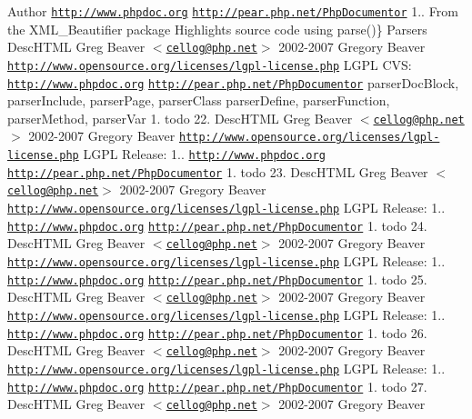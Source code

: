 \begin{DoxyAuthor}{\-Author}
\href{http://www.phpdoc.org}{\tt http\-://www.\-phpdoc.\-org}  \href{http://pear.php.net/PhpDocumentor}{\tt http\-://pear.\-php.\-net/\-Php\-Documentor}  1..  \-From the \-X\-M\-L\-\_\-\-Beautifier package \-Highlights source code using  parse()\}   \-Parsers   \-Desc\-H\-T\-M\-L  \-Greg \-Beaver $<$\href{mailto:cellog@php.net}{\tt cellog@php.\-net}$>$  2002-\/2007 \-Gregory \-Beaver  \href{http://www.opensource.org/licenses/lgpl-license.php}{\tt http\-://www.\-opensource.\-org/licenses/lgpl-\/license.\-php} \-L\-G\-P\-L  \-C\-V\-S\-:    \href{http://www.phpdoc.org}{\tt http\-://www.\-phpdoc.\-org}  \href{http://pear.php.net/PhpDocumentor}{\tt http\-://pear.\-php.\-net/\-Php\-Documentor}  parser\-Doc\-Block, parser\-Include, parser\-Page, parser\-Class  parser\-Define, parser\-Function, parser\-Method, parser\-Var  1.  todo 22.   \-Desc\-H\-T\-M\-L  \-Greg \-Beaver $<$\href{mailto:cellog@php.net}{\tt cellog@php.\-net}$>$  2002-\/2007 \-Gregory \-Beaver  \href{http://www.opensource.org/licenses/lgpl-license.php}{\tt http\-://www.\-opensource.\-org/licenses/lgpl-\/license.\-php} \-L\-G\-P\-L  \-Release\-: 1..  \href{http://www.phpdoc.org}{\tt http\-://www.\-phpdoc.\-org}  \href{http://pear.php.net/PhpDocumentor}{\tt http\-://pear.\-php.\-net/\-Php\-Documentor}  1.  todo 23.   \-Desc\-H\-T\-M\-L  \-Greg \-Beaver $<$\href{mailto:cellog@php.net}{\tt cellog@php.\-net}$>$  2002-\/2007 \-Gregory \-Beaver  \href{http://www.opensource.org/licenses/lgpl-license.php}{\tt http\-://www.\-opensource.\-org/licenses/lgpl-\/license.\-php} \-L\-G\-P\-L  \-Release\-: 1..  \href{http://www.phpdoc.org}{\tt http\-://www.\-phpdoc.\-org}  \href{http://pear.php.net/PhpDocumentor}{\tt http\-://pear.\-php.\-net/\-Php\-Documentor}  1.  todo 24.   \-Desc\-H\-T\-M\-L  \-Greg \-Beaver $<$\href{mailto:cellog@php.net}{\tt cellog@php.\-net}$>$  2002-\/2007 \-Gregory \-Beaver  \href{http://www.opensource.org/licenses/lgpl-license.php}{\tt http\-://www.\-opensource.\-org/licenses/lgpl-\/license.\-php} \-L\-G\-P\-L  \-Release\-: 1..  \href{http://www.phpdoc.org}{\tt http\-://www.\-phpdoc.\-org}  \href{http://pear.php.net/PhpDocumentor}{\tt http\-://pear.\-php.\-net/\-Php\-Documentor}  1.  todo 25.   \-Desc\-H\-T\-M\-L  \-Greg \-Beaver $<$\href{mailto:cellog@php.net}{\tt cellog@php.\-net}$>$  2002-\/2007 \-Gregory \-Beaver  \href{http://www.opensource.org/licenses/lgpl-license.php}{\tt http\-://www.\-opensource.\-org/licenses/lgpl-\/license.\-php} \-L\-G\-P\-L  \-Release\-: 1..  \href{http://www.phpdoc.org}{\tt http\-://www.\-phpdoc.\-org}  \href{http://pear.php.net/PhpDocumentor}{\tt http\-://pear.\-php.\-net/\-Php\-Documentor}  1.  todo 26.   \-Desc\-H\-T\-M\-L  \-Greg \-Beaver $<$\href{mailto:cellog@php.net}{\tt cellog@php.\-net}$>$  2002-\/2007 \-Gregory \-Beaver  \href{http://www.opensource.org/licenses/lgpl-license.php}{\tt http\-://www.\-opensource.\-org/licenses/lgpl-\/license.\-php} \-L\-G\-P\-L  \-Release\-: 1..  \href{http://www.phpdoc.org}{\tt http\-://www.\-phpdoc.\-org}  \href{http://pear.php.net/PhpDocumentor}{\tt http\-://pear.\-php.\-net/\-Php\-Documentor}  1.  todo 27.   \-Desc\-H\-T\-M\-L  \-Greg \-Beaver $<$\href{mailto:cellog@php.net}{\tt cellog@php.\-net}$>$  2002-\/2007 \-Gregory \-Beaver  
\end{DoxyAuthor}
